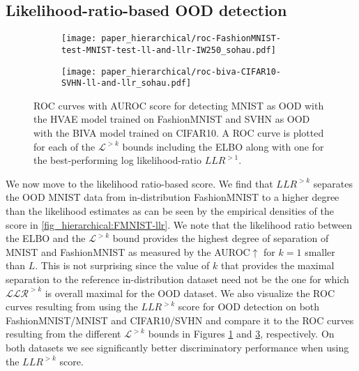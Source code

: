 {\subsection{Likelihood-ratio-based OOD detection}
\begin{figure}[t]
    \centering
    \begin{subfigure}[l]{0.495\columnwidth}
        \texttt{[image: paper\_hierarchical/roc-FashionMNIST-test-MNIST-test-ll-and-llr-IW250\_sohau.pdf]}
        \caption{}
        \label{fig_hierarchical:FMNIST-roc-llr}
    \end{subfigure}
    \hfill
    \begin{subfigure}[r]{0.495\columnwidth}
        \texttt{[image: paper\_hierarchical/roc-biva-CIFAR10-SVHN-ll-and-llr\_sohau.pdf]}
        \caption{}
        \label{fig_hierarchical:CIFAR10-roc-llr}
    \end{subfigure}
    \caption[ROC curves for out of distribution detection (MNIST/FashionMNIST and SVHN/CIFAR10).]{%
        ROC curves with AUROC score for detecting  MNIST as OOD with the HVAE model trained on FashionMNIST and  SVHN as OOD with the BIVA model trained on CIFAR10. 
        A ROC curve is plotted for each of the $\mathcal{L}^{>k}$ bounds including the ELBO along with one for the best-performing log likelihood-ratio $LLR^{>1}$.
    }
\end{figure}
We now move to the likelihood ratio-based score.
We find that $LLR^{>k}$ separates the OOD MNIST data from in-distribution FashionMNIST to a higher degree than the likelihood estimates as can be seen by the empirical densities of the score in \cref{fig_hierarchical:FMNIST-llr}.
We note that the likelihood ratio between the ELBO and the $\mathcal{L}^{>k}$ bound provides the highest degree of separation of MNIST and FashionMNIST as measured by the AUROC$\uparrow$ for $k=1$ smaller than $L$.
This is not surprising since the value of $k$ that provides the maximal separation to the reference in-distribution dataset need not be the one for which $\mathcal{LLR}^{>k}$ is overall maximal for the OOD dataset.
We also visualize the ROC curves resulting from using the $LLR^{>k}$ score for OOD detection on both FashionMNIST/MNIST and CIFAR10/SVHN and compare it to the ROC curves resulting from the different $\mathcal{L}^{>k}$ bounds in Figures \ref{fig_hierarchical:FMNIST-roc-llr} and \ref{fig_hierarchical:CIFAR10-roc-llr}, respectively.
On both datasets we see significantly better discriminatory performance when using the $LLR^{>k}$ score.

}
